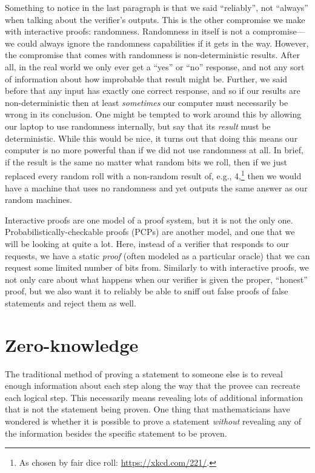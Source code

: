 \documentclass[english,12pt]{reedthesis}
\theoremstyle{plain}
\theoremstyle{definition}
\theoremstyle{remark}
\begin{document}
Something to notice in the last paragraph is that we said ``reliably'', not
``always'' when talking about the verifier's outputs. This is the other
compromise we make with interactive proofs: randomness. Randomness in itself is
not a compromise---we could always ignore the randomness capabilities if it gets
in the way. However, the compromise that comes with randomness is
non-deterministic results. After all, in the real world we only ever get a
``yes'' or ``no'' response, and not any sort of information about how improbable
that result might be. Further, we said before that any input has exactly one
correct response, and so if our results are non-deterministic then at least
\emph{sometimes} our computer must necessarily be wrong in its conclusion. One
might be tempted to work around this by allowing our laptop to use randomness
internally, but say that its \emph{result} must be deterministic. While this
would be nice, it turns out that doing this means our computer is no more
powerful than if we did not use randomness at all. In brief, if the result is
the same no matter what random bits we roll, then if we just replaced every
random roll with a non-random result of, e.g., 4,\footnote{As chosen by fair
  dice roll: \url{https://xkcd.com/221/}.} then we would have a machine that
uses no randomness and yet outputs the same answer as our random machines.

Interactive proofs are one model of a proof system, but it is not the only one.
Probabilistically-checkable proofs (PCPs) are another model, and one that we
will be looking at quite a lot. Here, instead of a verifier that responds to our
requests, we have a static \emph{proof} (often modeled as a particular oracle)
that we can request some limited number of bits from. Similarly to with
interactive proofs, we not only care about what happens when our verifier is
given the proper, ``honest'' proof, but we also want it to reliably be able to
sniff out false proofs of false statements and reject them as well.

\section{Zero-knowledge}

The traditional method of proving a statement to someone else is to reveal
enough information about each step along the way that the provee can recreate
each logical step. This necessarily means revealing lots of additional
information that is not the statement being proven. One thing that
mathematicians have wondered is whether it is possible to prove a statement
\emph{without} revealing any of the information besides the specific statement
to be proven.
\end{document}
